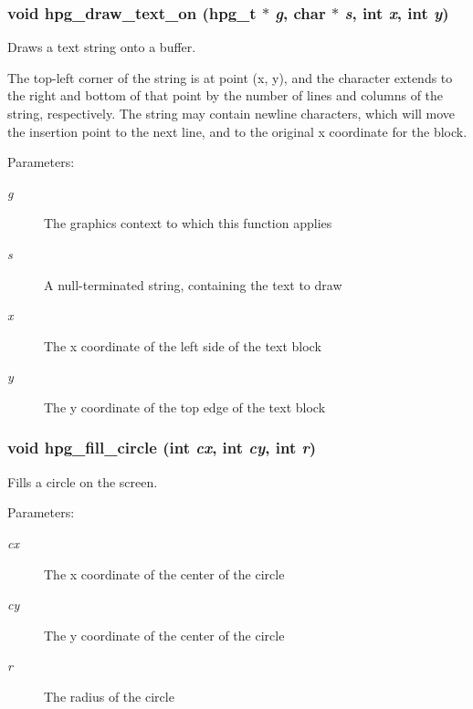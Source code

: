 \subsubsection{\setlength{\rightskip}{0pt plus 5cm}void hpg\_\-draw\_\-text\_\-on ({\bf hpg\_\-t} $\ast$ {\em g}, char $\ast$ {\em s}, int {\em x}, int {\em y})}\label{hpgraphics_8h_a60}


Draws a text string onto a buffer.

The top-left corner of the string is at point (x, y), and the character extends to the right and bottom of that point by the number of lines and columns of the string, respectively. The string may contain newline characters, which will move the insertion point to the next line, and to the original x coordinate for the block.\begin{Desc}
\item[Parameters: ]\par
\begin{description}
\item[{\em 
g}]The graphics context to which this function applies \item[{\em 
s}]A null-terminated string, containing the text to draw \item[{\em 
x}]The x coordinate of the left side of the text block \item[{\em 
y}]The y coordinate of the top edge of the text block \end{description}
\end{Desc}
\subsubsection{\setlength{\rightskip}{0pt plus 5cm}void hpg\_\-fill\_\-circle (int {\em cx}, int {\em cy}, int {\em r})}\label{hpgraphics_8h_a51}


Fills a circle on the screen.

\begin{Desc}
\item[Parameters: ]\par
\begin{description}
\item[{\em 
cx}]The x coordinate of the center of the circle \item[{\em 
cy}]The y coordinate of the center of the circle \item[{\em 
r}]The radius of the circle \end{description}
\end{Desc}
